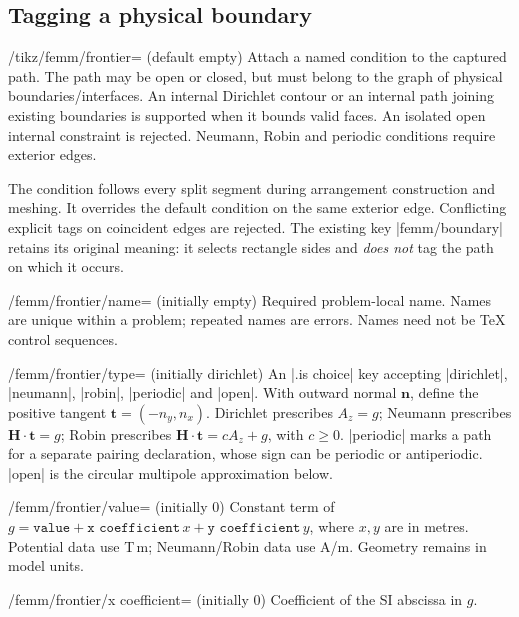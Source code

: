 \subsection{Tagging a physical boundary}
\begin{key}{/tikz/femm/frontier= (default \normalfont empty)}
Attach a named condition to the captured path. The path may be open or closed,
but must belong to the graph of physical boundaries/interfaces. An internal
Dirichlet contour or an internal path joining existing boundaries is supported
when it bounds valid faces. An isolated open internal constraint is rejected.
Neumann, Robin and periodic conditions require exterior edges.

The condition follows every split segment during arrangement construction and
meshing. It overrides the default condition on the same exterior edge.
Conflicting explicit tags on coincident edges are rejected. The existing key
|femm/boundary| retains its original meaning: it selects rectangle sides and
\emph{does not} tag the path on which it occurs.
\end{key}
\begin{key}{/femm/frontier/name= (initially empty)}
Required problem-local name. Names are unique within a problem; repeated names
are errors. Names need not be TeX control sequences.
\end{key}
\begin{key}{/femm/frontier/type= (initially dirichlet)}
An |.is choice| key accepting |dirichlet|, |neumann|, |robin|, |periodic| and
|open|. With outward normal $\mathbf n$, define the positive tangent
$\mathbf t=(-n_y,n_x)$. Dirichlet prescribes $A_z=g$; Neumann prescribes
$\mathbf H\cdot\mathbf t=g$; Robin prescribes
$\mathbf H\cdot\mathbf t=cA_z+g$, with $c\geq0$.
|periodic| marks a path for a separate pairing declaration, whose sign can be
periodic or antiperiodic. |open| is the circular multipole approximation below.
\end{key}
\begin{key}{/femm/frontier/value= (initially 0)}
Constant term of $g=\texttt{value}+\texttt{x coefficient}\,x+
\texttt{y coefficient}\,y$, where $x,y$ are in metres. Potential data use T\,m;
Neumann/Robin data use A/m. Geometry remains in model units.
\end{key}
\begin{key}{/femm/frontier/x coefficient= (initially 0)}
Coefficient of the SI abscissa in $g$.
\end{key}
